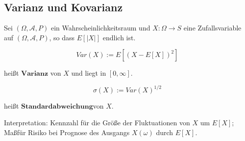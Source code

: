 \subsection{Varianz und Kovarianz}

Sei $(\Omega,\mathcal{A},P)$ ein Wahrscheinlichkeitsraum und $X:\Omega\rightarrow S$
eine Zufallsvariable auf $(\Omega,\mathcal{A},P)$, so dass   $E[|X|]$
endlich ist.

\begin{definition}

\[
Var(X):=E[(X-E[X])^{2}]
\]


hei\ss t $\mathbf{Varianz}$ von $X$ und liegt in $[0,\infty]$.

\[
\sigma(X):=Var(X)^{1/2}
\]


hei\ss t $\mathbf{Standardabweichung}$von $X$.

\end{definition}

Interpretation: Kennzahl f\"ur die Gr\"o\ss e der Fluktuationen von $X$
um $E[X]$; Ma\ss  f\"ur Risiko bei Prognose des Ausgangs $X(\omega)$
durch $E[X]$.

